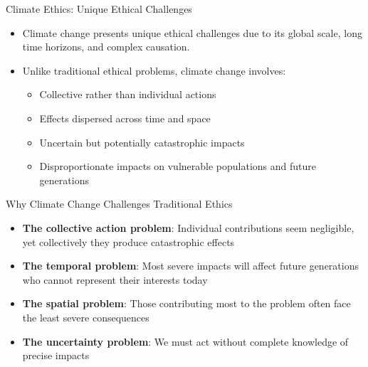 \documentclass{beamer}
\begin{document}
	\begin{frame}{Climate Ethics: Unique Ethical Challenges}
		\begin{itemize}
			\item Climate change presents unique ethical challenges due to its global scale, long time horizons, and complex causation.
			\item Unlike traditional ethical problems, climate change involves:
			\begin{itemize}
				\item Collective rather than individual actions
				\item Effects dispersed across time and space
				\item Uncertain but potentially catastrophic impacts
				\item Disproportionate impacts on vulnerable populations and future generations
			\end{itemize}
		
		\end{itemize}
		
		\begin{block}{Why Climate Change Challenges Traditional Ethics}
			\scriptsize
			\begin{itemize}
				\item \textbf{The collective action problem}: Individual contributions seem negligible, yet collectively they produce catastrophic effects
				\item \textbf{The temporal problem}: Most severe impacts will affect future generations who cannot represent their interests today
				\item \textbf{The spatial problem}: Those contributing most to the problem often face the least severe consequences
				\item \textbf{The uncertainty problem}: We must act without complete knowledge of precise impacts
			\end{itemize}
		\end{block}
	\end{frame}
	
\end{document}
